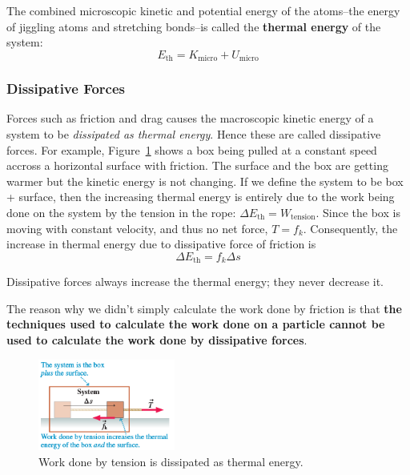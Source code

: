 The combined microscopic kinetic and potential energy of the atoms--the energy of jiggling atoms and
stretching bonds--is called the \textbf{thermal energy} of the system:
\begin{equation}
    E_\mathrm{th} = K_\mathrm{micro} + U_\mathrm{micro}
\end{equation}

\subsubsection{Dissipative Forces}

Forces such as friction and drag causes the macroscopic kinetic energy of a system to be 
\emph{dissipated as thermal energy}. Hence these are called dissipative forces.
For example, Figure~\ref{fig:dissipated-force-example} shows a box being pulled at a constant speed accross a horizontal surface with friction.
The surface and the box are getting warmer but the kinetic energy is not changing. If we define the system to be box + surface, then the increasing thermal energy is entirely due to the 
work being done on the system by the tension in the rope: $\Delta E_\mathrm{th} = W_\mathrm{tension}$.
Since the box is moving with constant velocity, and thus no net force, $T = f_k$. Consequently, the increase in thermal energy due to dissipative force of friction is 
\begin{equation}
    \Delta E_\mathrm{th} = f_k \Delta s
\end{equation}
\begin{remark}
    Dissipative forces always increase the thermal energy; they never decrease it.
\end{remark}
The reason why we didn't simply calculate the work done by friction is that \textbf{the techniques used to calculate the work done on a particle cannot be used to calculate the work done by dissipative forces}.

\begin{figure}
    \centering
    \includegraphics[width=0.4\textwidth]{../figures/dissipated-force-example.png}
    \caption{Work done by tension is dissipated as thermal energy.}
    \label{fig:dissipated-force-example}
\end{figure}

